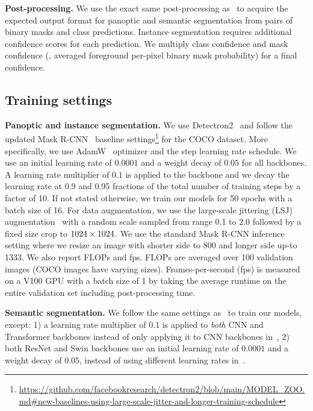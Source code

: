 \noindent\textbf{Post-processing.} We use the exact same post-processing as~\cite{cheng2021maskformer} to acquire the expected output format for panoptic and semantic segmentation from pairs of binary masks and class predictions. Instance segmentation requires additional confidence scores for each prediction. We multiply class confidence and mask confidence (\ie, averaged foreground per-pixel binary mask probability) for a final confidence. %

\subsection{Training settings}
\noindent\textbf{Panoptic and instance segmentation.} We use Detectron2~\cite{wu2019detectron2} and follow the updated Mask R-CNN~\cite{he2017mask} baseline settings\footnote{\scriptsize \url{https://github.com/facebookresearch/detectron2/blob/main/MODEL\_ZOO.md\#new-baselines-using-large-scale-jitter-and-longer-training-schedule}} for the COCO dataset. More specifically, we use AdamW~\cite{loshchilov2018decoupled} optimizer and the step learning rate  schedule. We use an initial learning rate of $0.0001$ and a weight decay of $0.05$ for all backbones. A learning rate multiplier of $0.1$ is applied to the backbone and we decay the learning rate at 0.9 and 0.95 fractions of the total number of training steps by a factor of 10. If not stated otherwise, we train our models for 50 epochs with a batch size of 16. For data augmentation, we use the large-scale jittering (LSJ) augmentation~\cite{ghiasi2021simple,du2021simple} with a random scale sampled from range 0.1 to 2.0 followed by a fixed size crop to $1024\times1024$. We use the standard Mask R-CNN inference setting where we resize an image with shorter side to 800 and longer side up-to 1333. We also report FLOPs and fps. FLOPs are averaged over 100 validation images (COCO images have varying sizes). Frames-per-second (fps) is measured on a V100 GPU with a batch size of 1 by taking the average runtime on the entire validation set including post-processing time.

\noindent\textbf{Semantic segmentation.} We follow the same settings as~\cite{cheng2021maskformer} to train our models, except: 1) a learning rate multiplier of 0.1 is applied to \emph{both} CNN and Transformer backbones instead of only applying it to CNN backbones in~\cite{cheng2021maskformer},
2) both ResNet and Swin backbones use an initial learning rate of $0.0001$ and a weight decay of $0.05$, instead of using different learning rates in~\cite{cheng2021maskformer}.

